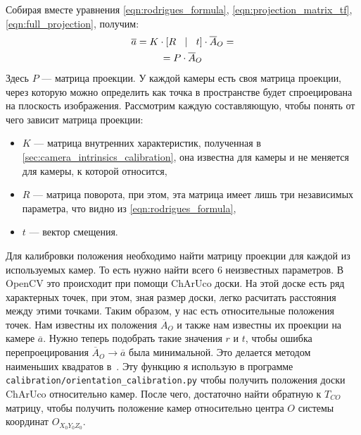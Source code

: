 \documentclass[12pt, a4paper]{article}
\begin{document}
\par
Собирая вместе уравнения \eqref{eqn:rodrigues_formula}, \eqref{eqn:projection_matrix_tf}, \eqref{eqn:full_projection}, получим:
\begin{equation}
\begin{gathered}
    \overline{a} = K \cdot \left[R \quad \vline \quad t\right] \cdot \overline{A}_O = \\
    = P \cdot \overline{A}_O
\end{gathered}
\label{eqn:proj_fomula_with_projection_matrix}
\end{equation}
Здесь $P$ --- матрица проекции. У каждой камеры есть своя матрица проекции, через которую можно определить как точка в пространстве будет спроецирована на плоскость изображения.
Рассмотрим каждую составляющую, чтобы понять от чего зависит матрица проекции:
\begin{itemize}
    \item $K$ --- матрица внутренних характеристик, полученная в
    \ref{sec:camera_intrinsics_calibration}, она известна для камеры и не
    меняется для камеры, к которой относится,

    \item $R$ --- матрица поворота, при этом, эта матрица имеет лишь три
    независимых параметра, что видно из \ref{eqn:rodrigues_formula},

    \item $t$ --- вектор смещения.
\end{itemize}
\par
Для калибровки положения необходимо найти матрицу проекции для каждой из
используемых камер. То есть нужно найти всего 6 неизвестных параметров. В OpenCV
это происходит при помощи ChArUco доски. На этой доске есть ряд характерных
точек, при этом, зная размер доски, легко расчитать расстояния между этими
точками. Таким образом, у нас есть относительные положения точек. Нам известны
их положения $\overline{A}_O$ и также нам известны их проекции на камере
$\overline{a}$. Нужно теперь подобрать такие значения $r$ и $t$, чтобы ошибка
перепроецирования $\overline{A}_O \rightarrow \overline{a}$ была минимальной.
Это делается методом наименьших квадратов в~\cite{opencv_charuco_pose}. Эту функцию
я использую в программе \texttt{calibration/orientation\_calibration.py} чтобы
получить положения доски ChArUco относительно камер. После чего, достаточно найти обратную к $T_{CO}$ матрицу, чтобы получить положение камер относительно центра $O$ системы координат $O_{X_0Y_0Z_0}$.
\end{document}
